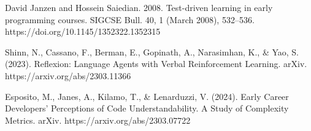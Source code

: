 \documentclass[12pt]{extarticle}
\begin{document}
\begin{thebibliography}{9}
David Janzen and Hossein Saiedian. 2008. Test-driven learning in early programming courses. SIGCSE Bull. 40, 1 (March 2008), 532–536. https://doi.org/10.1145/1352322.1352315

Shinn, N., Cassano, F., Berman, E., Gopinath, A., Narasimhan, K., \& Yao, S. (2023). Reflexion: Language Agents with Verbal Reinforcement Learning. arXiv. https://arxiv.org/abs/2303.11366

Esposito, M., Janes, A., Kilamo, T., \& Lenarduzzi, V. (2024). Early Career Developers' Perceptions of Code Understandability. A Study of Complexity Metrics. arXiv. https://arxiv.org/abs/2303.07722

\end{thebibliography}
\end{document}
